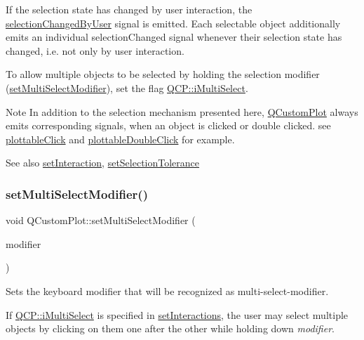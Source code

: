 If the selection state has changed by user interaction, the \hyperlink{class_q_custom_plot_a500c64a109bc773c973ad274f2fa4190}{selection\+Changed\+By\+User} signal is emitted. Each selectable object additionally emits an individual selection\+Changed signal whenever their selection state has changed, i.\+e. not only by user interaction.

To allow multiple objects to be selected by holding the selection modifier (\hyperlink{class_q_custom_plot_a8fc96e3b5138a06759a2a90c166df516}{set\+Multi\+Select\+Modifier}), set the flag \hyperlink{namespace_q_c_p_a2ad6bb6281c7c2d593d4277b44c2b037aef673112c5067c3cf4cfddb62da7265d}{Q\+C\+P\+::i\+Multi\+Select}.

\begin{DoxyNote}{Note}
In addition to the selection mechanism presented here, \hyperlink{class_q_custom_plot}{Q\+Custom\+Plot} always emits corresponding signals, when an object is clicked or double clicked. see \hyperlink{class_q_custom_plot_a57e5efa8a854620e9bf62d31fc139f53}{plottable\+Click} and \hyperlink{class_q_custom_plot_af2e6f1cea923dae437681d01ce7d0c31}{plottable\+Double\+Click} for example.
\end{DoxyNote}
\begin{DoxySeeAlso}{See also}
\hyperlink{class_q_custom_plot_a422bf1bc6d56dac75a3d805d9a65902c}{set\+Interaction}, \hyperlink{class_q_custom_plot_a4dc31241d7b09680950e19e5f971ed93}{set\+Selection\+Tolerance} 
\end{DoxySeeAlso}
\hypertarget{class_q_custom_plot_a8fc96e3b5138a06759a2a90c166df516}{}\label{class_q_custom_plot_a8fc96e3b5138a06759a2a90c166df516} 
\subsubsection{\texorpdfstring{set\+Multi\+Select\+Modifier()}{setMultiSelectModifier()}}
{\footnotesize\ttfamily void Q\+Custom\+Plot\+::set\+Multi\+Select\+Modifier (\begin{DoxyParamCaption}\item[{Qt\+::\+Keyboard\+Modifier}]{modifier }\end{DoxyParamCaption})}

Sets the keyboard modifier that will be recognized as multi-\/select-\/modifier.

If \hyperlink{namespace_q_c_p_a2ad6bb6281c7c2d593d4277b44c2b037aef673112c5067c3cf4cfddb62da7265d}{Q\+C\+P\+::i\+Multi\+Select} is specified in \hyperlink{class_q_custom_plot_a5ee1e2f6ae27419deca53e75907c27e5}{set\+Interactions}, the user may select multiple objects by clicking on them one after the other while holding down {\itshape modifier}.

